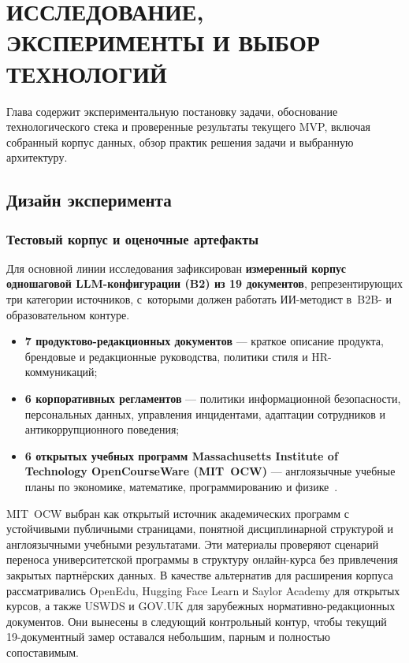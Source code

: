 \chapter{ИССЛЕДОВАНИЕ, ЭКСПЕРИМЕНТЫ И ВЫБОР ТЕХНОЛОГИЙ}

Глава содержит экспериментальную постановку задачи, обоснование
технологического стека и проверенные результаты текущего MVP, включая
собранный корпус данных, обзор практик решения задачи и выбранную
архитектуру.

\section{Дизайн эксперимента}

\subsection{Тестовый корпус и оценочные артефакты}

Для основной линии исследования зафиксирован
\textbf{измеренный корпус одношаговой LLM-конфигурации (B2) из 19 документов},
репрезентирующих три категории источников, с~которыми должен работать
ИИ-методист в~B2B- и образовательном контуре.

\begin{itemize}
  \item \textbf{7 продуктово-редакционных документов} —
    краткое описание продукта, брендовые и редакционные руководства,
    политики стиля и HR-коммуникаций;
  \item \textbf{6 корпоративных регламентов} —
    политики информационной безопасности, персональных данных,
    управления инцидентами, адаптации сотрудников и антикоррупционного поведения;
  \item \textbf{6 открытых учебных программ Massachusetts Institute of
    Technology OpenCourseWare (MIT~OCW)} —
    англоязычные учебные планы по экономике, математике, программированию
    и физике~\cite{mit_ocw_2024}.
\end{itemize}

MIT~OCW выбран как открытый источник академических программ с устойчивыми
публичными страницами, понятной дисциплинарной структурой и англоязычными
учебными результатами. Эти материалы проверяют сценарий переноса
университетской программы в структуру онлайн-курса без привлечения закрытых
партнёрских данных. В качестве альтернатив для расширения корпуса
рассматривались OpenEdu, Hugging Face Learn и Saylor Academy для открытых
курсов, а также USWDS и GOV.UK для зарубежных нормативно-редакционных
документов. Они вынесены в следующий контрольный контур, чтобы текущий
19-документный замер оставался небольшим, парным и полностью сопоставимым.

